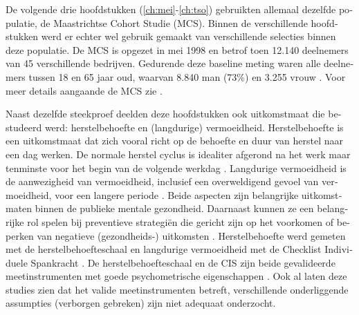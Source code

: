 \begin{otherlanguage}{dutch}
De volgende drie hoofdstukken (\ref{ch:mei}-\ref{ch:tso}) gebruikten allemaal dezelfde populatie, de Maastrichtse Cohort Studie (MCS). Binnen de verschillende hoofdstukken werd er echter wel gebruik gemaakt van verschillende selecties binnen deze populatie. De MCS is opgezet in mei 1998 en betrof toen 12.140 deelnemers van 45 verschillende bedrijven. Gedurende deze baseline meting waren alle deelnemers tussen 18 en 65 jaar oud, waarvan 8.840 man (73\%) en 3.255 vrouw \parencite{Kant_2003, Mohren_2007}. Voor meer details aangaande de MCS zie \textcite{Mohren_2007}. 

Naast dezelfde steekproef deelden deze hoofdstukken ook uitkomstmaat die bestudeerd werd: herstelbehoefte en (langdurige) vermoeidheid. Herstelbehoefte is een uitkomstmaat dat zich vooral richt op de behoefte en duur van herstel naar een dag werken. De normale herstel cyclus is idealiter afgerond na het werk maar tenminste voor het begin van de volgende werkdag \parencite{Veldhoven_2008}. Langdurige vermoeidheid is de aanwezigheid van vermoeidheid, inclusief een overweldigend gevoel van vermoeidheid, voor een langere periode \parencite{Bultmann_2000,Kalkman_2008}. Beide aspecten zijn belangrijke uitkomstmaten binnen de publieke mentale gezondheid. Daarnaast kunnen ze een belangrijke rol spelen bij preventieve strategi\"en die gericht zijn op het voorkomen of beperken van negatieve (gezondheids-) uitkomsten \parencite[bijv.,][]{Croon_2003,Amelsvoort_2003,Raeve_2009,Amelsvoort_2002,Silva_2012}. Herstelbehoefte werd gemeten met de herstelbehoefteschaal \parencite{Veldhoven_2003} en langdurige vermoeidheid met de Checklist Individuele Spankracht \parencite{Vercoulen_1994,Beurskens_2000}. De herstelbehoefteschaal en de CIS zijn beide gevalideerde meetinstrumenten met goede psychometrische eigenschappen \parencite[bijv.,][]{Veldhoven_2003,Bultmann_2000,Beurskens_2000,Sluiter_2001,Amelsvoort_2003}. Ook al laten deze studies zien dat het valide meetinstrumenten betreft, verschillende onderliggende assumpties (verborgen gebreken) zijn niet adequaat onderzocht. 


\end{otherlanguage}
